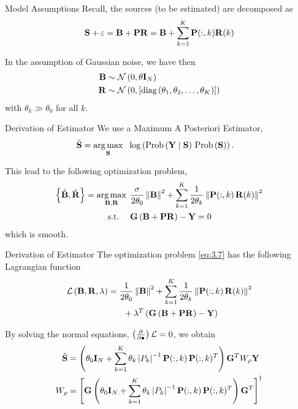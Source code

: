 \documentclass[progressbar=head]{beamer}
\begin{document}
\begin{frame}{Model Assumptions}
Recall, the sources (to be estimated) are decomposed as
\begin{equation}
    {\mathbf{S}} + \varepsilon = {\mathbf{B}} + \mathbf{P} {\mathbf{R}}
    = {\mathbf{B}} + \sum_{k=1}^K \mathbf{P}(:,k) {\mathbf{R}}(k)
\end{equation}

In the assumption of Gaussian noise, we have then
\begin{align}
    \mathbf{B} &\sim \mathcal{N}\left( 0, \theta \mathbf{I}_N  \right) 
     \\
    \mathbf{R} &\sim \mathcal{N}\left( 0, 
    \left[ \text{diag}\left( \theta_1, \theta_2, \dots, \theta_K \right) \right]  \right)
\end{align}
with $\theta_k \gg \theta_0$ for all $k$.
\end{frame}

\begin{frame}{Derivation of Estimator}
We use a Maximum A Posteriori Estimator,
\begin{align}
    \hat{\mathbf{S}} &= 
    \operatorname*{arg\,max}_{\mathbf{S} }\, 
    \phantom{.}
    \log \left( 
    \text{Prob}\left(  \mathbf{Y} \;\middle|\; \mathbf{S}  \right)\,  \text{Prob}\left(  \mathbf{S}  \right)  \right).
\end{align}

This lead to the following optimization problem,
\begin{align}
    \left\{  \hat{\mathbf{B}}, \hat{\mathbf{R}}  \right\} 
    =
    \operatorname*{arg\,max}_{\mathbf{B}, \mathbf{R} }\, 
    &\phantom{.}
    \frac{\sigma}{2 \theta_0} \left\lVert \mathbf{B} \right\rVert^2
    +
    \sum_{k=1}^K \frac{1}{2\theta_k } \left\lVert \mathbf{P}(:,k)\, \mathbf{R}(k) \right\rVert^2
    \nonumber \\
    \text{s.t.}
    \quad
    &\phantom{.}
    {\mathbf{G} \left( \mathbf{B} + \mathbf{P} \mathbf{R} \right) } - \mathbf{Y} = 0
    \label{eq:3.7}
\end{align}
which is smooth.
\end{frame}

\begin{frame}{Derivation of Estimator}
The optimization problem \ref{eq:3.7} has the following Lagrangian function
\begin{align}
    \mathcal{L}\left( \mathbf{B}, \mathbf{R}, \lambda \right) &=
    \frac{1}{2 \theta_0} \left\lVert \mathbf{B} \right\rVert^2
    +
    \sum_{k=1}^K \frac{1}{2 \theta_k} \left\lVert \mathbf{P}(:,k)\, \mathbf{R}(k) \right\rVert^2
    \nonumber \\
    &\phantom{=} \quad
    +
    \lambda^T \left( {\mathbf{G} \left( \mathbf{B} + \mathbf{P} \mathbf{R} \right) } - \mathbf{Y} \right)
\end{align}

By solving the normal equations, $\left( \frac{\partial}{\partial \bullet} \right) \mathcal{L} = 0$, we obtain
\begin{align*}
    \hat{\mathbf{S}}
    &=
    \left(  \theta_0 \mathbf{I}_N + \sum_{k=1}^K \theta_k \left| {P_k} \right|^{-1} 
    \mathbf{P}(:,k)\, \mathbf{P}(:,k)^T
     \right) \mathbf{G}^T W_\rho \mathbf{Y}
    \\
    W_\rho &=
    \left[ \mathbf{G} \left(  \theta_0 \mathbf{I}_N + \sum_{k=1}^K \theta_k \left| {P_k} \right|^{-1} 
    \mathbf{P}(:,k)\, \mathbf{P}(:,k)^T
     \right) \mathbf{G}^T  \right]^\dagger
\end{align*}
\end{frame}
\end{document}

